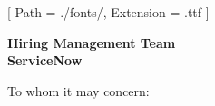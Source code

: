 


\renewcommand{\photo}[2]{}

\geometry{
  left=2cm,
  right=2cm,
  top=2cm,
  bottom=2cm
}



\makecvheader

\setmainfont{NotoSans-Regular}[
  Path = ./fonts/,
  Extension = .ttf
]

\vspace{1cm}
\indent\textbf{Hiring Management Team}\\
\indent\textbf{ServiceNow}

\vspace{0.5cm}

\noindent To whom it may concern:

\vspace{0.5cm}

